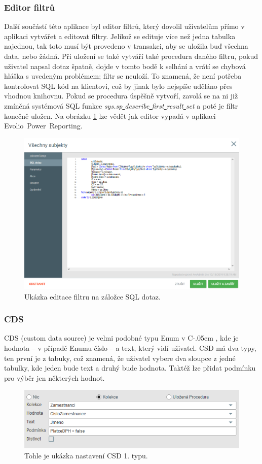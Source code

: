 \documentclass[czech,bachelorpractice,dept460,male,csharp]{diploma}
\newcommand{\EFilters}{Evolio~Power~Reporting}
\newcommand{\Csharp}{%
  {\settoheight{\dimen0}{C}C\kern-.05em \resizebox{!}{\dimen0}{\raisebox{\depth}{\#}}}}
\newcommand{\un}{\underline{ }}
\begin{document}
		\subsubsection{Editor filtrů}
			Další součástí této aplikace byl editor filtrů, který dovolil uživatelům přímo v aplikaci vytvářet a editovat filtry. Jelikož se edituje více než jedna tabulka najednou, tak toto musí být provedeno v transakci, aby se uložila buď všechna data, nebo žádná. Při uložení se také vytváří také procedura daného filtru, pokud uživatel napsal dotaz špatně, dojde v tomto bodě k selhání a vrátí se chybová hláška s uvedeným problémem; filtr se neuloží. To znamená, že není potřeba kontrolovat SQL kód na klientovi, což by jinak bylo nejspíše uděláno přes vhodnou knihovnu. Pokud se procedura úspěšně vytvoří, zavolá se na ni již zmíněná systémová SQL funkce \textit{sys.sp{\un}describe{\un}first{\un}result{\un}set} a poté je filtr konečně uložen. Na obrázku \ref{fig:Editimg} lze vědět jak editor vypadá v aplikaci \EFilters.
			\begin{figure}[h]
				\includegraphics[width=1.0\textwidth]{Figures/Edit.png}
				\caption{Ukázka editace filtru na záložce SQL dotaz.}
    			\label{fig:Editimg}
			\end{figure}
		\subsubsection{CDS}
		\label{txt:cds}
			CDS (custom data source) je velmi podobné typu Enum v \Csharp, kde je hodnota -- v případě Enumu číslo -- a text, který vidí uživatel. CSD má dva typy, ten první je z tabuky, což znamená, že uživatel vybere dva sloupce z jedné tabulky, kde jeden bude text a druhý bude hodnota. Taktéž lze přidat podmínku pro výběr jen některých hodnot.
			\begin{figure}[h]
				\includegraphics{Figures/cds.png}
				\caption{Tohle je ukázka nastavení CSD 1. typu.}
    			\label{fig:CSDimg}
			\end{figure}
			
\end{document}
